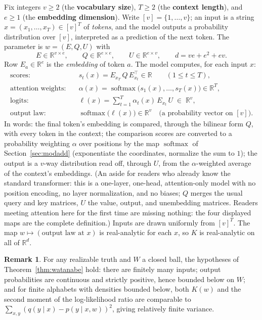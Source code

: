 \documentclass[11pt]{amsart}
\theoremstyle{plain}
\theoremstyle{definition}
\newtheorem{remark}[theorem]{Remark}
\newcommand{\R}{\mathbb{R}}
\DeclareMathOperator{\softmax}{softmax}
\begin{document}
Fix integers $v \ge 2$ (the \textbf{vocabulary size}), $T \ge 2$ (the \textbf{context length}), and $e \ge 1$ (the \textbf{embedding dimension}). Write $[v] = \{1, \dots, v\}$; an input is a string $x = (x_1, \dots, x_T) \in [v]^T$ of \emph{tokens}, and the model outputs a probability distribution over $[v]$, interpreted as a prediction of the next token. The parameter is $w = (E, Q, U)$ with
\[
   E \in \R^{v \times e}, \qquad Q \in \R^{e \times e}, \qquad U \in \R^{e \times v},
   \qquad d = ve + e^2 + ev.
\]
Row $E_a \in \R^e$ is the \emph{embedding} of token $a$. The model computes, for each input $x$:
\begin{align*}
   \text{scores:} \quad & s_t(x) = E_{x_T}\, Q\, E_{x_t}^{\!\top} \in \R \qquad (1 \le t \le T), \\
   \text{attention weights:} \quad & \alpha(x) = \softmax\bigl(s_1(x), \dots, s_T(x)\bigr) \in \R^T, \\
   \text{logits:} \quad & \ell(x) = \sum_{t=1}^{T} \alpha_t(x)\, E_{x_t}\, U \;\in\; \R^v, \\
   \text{output law:} \quad & \softmax\bigl(\ell(x)\bigr) \in \R^v \quad \text{(a probability vector on } [v]).
\end{align*}
In words: the final token's embedding is compared, through the bilinear form $Q$, with every token in the context; the comparison scores are converted to a probability weighting $\alpha$ over positions by the map $\softmax$ of Section~\ref{sec:modadd} (exponentiate the coordinates, normalize the sum to $1$); the output is a $v$-way distribution read off, through $U$, from the $\alpha$-weighted average of the context's embeddings. (An aside for readers who already know the standard transformer: this is a one-layer, one-head, attention-only model with no position encoding, no layer normalization, and no biases; $Q$ merges the usual query and key matrices, $U$ the value, output, and unembedding matrices. Readers meeting attention here for the first time are missing nothing: the four displayed maps are the complete definition.) Inputs are drawn uniformly from $[v]^T$. The map $w \mapsto (\text{output law at } x)$ is real-analytic for each $x$, so $K$ is real-analytic on all of $\R^d$.

\begin{remark}\label{rem:conditions-attn}
For any realizable truth and $W$ a closed ball, the hypotheses of Theorem~\ref{thm:watanabe} hold: there are finitely many inputs; output probabilities are continuous and strictly positive, hence bounded below on $W$; and for finite alphabets with densities bounded below, both $K(w)$ and the second moment of the log-likelihood ratio are comparable to $\sum_{x,y}(q(y\mid x) - p(y \mid x, w))^2$, giving relatively finite variance.
\end{remark}
\end{document}
